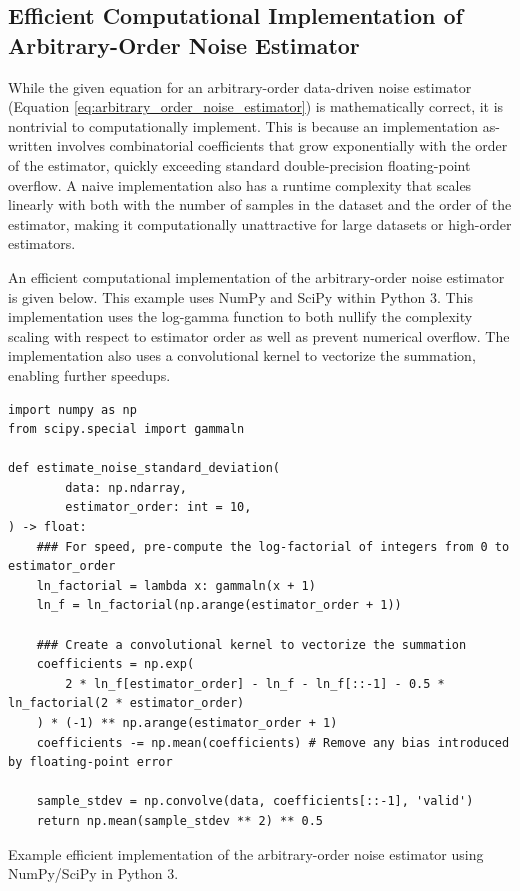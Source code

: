 \documentclass[conf]{new-aiaa}
\begin{document}
    \newpage

    \subsection{Efficient Computational Implementation of Arbitrary-Order Noise Estimator}

    While the given equation for an arbitrary-order data-driven noise estimator (Equation \ref{eq:arbitrary_order_noise_estimator}) is mathematically correct, it is nontrivial to computationally implement. This is because an implementation as-written involves combinatorial coefficients that grow exponentially with the order of the estimator, quickly exceeding standard double-precision floating-point overflow. A naive implementation also has a runtime complexity that scales linearly with both with the number of samples in the dataset and the order of the estimator, making it computationally unattractive for large datasets or high-order estimators.

    An efficient computational implementation of the arbitrary-order noise estimator is given below. This example uses NumPy and SciPy within Python 3. This implementation uses the log-gamma function to both nullify the complexity scaling with respect to estimator order as well as prevent numerical overflow. The implementation also uses a convolutional kernel to vectorize the summation, enabling further speedups.

    \begin{listing}[H]
        \begin{verbatim}
import numpy as np
from scipy.special import gammaln

def estimate_noise_standard_deviation(
        data: np.ndarray,
        estimator_order: int = 10,
) -> float:
    ### For speed, pre-compute the log-factorial of integers from 0 to estimator_order
    ln_factorial = lambda x: gammaln(x + 1)
    ln_f = ln_factorial(np.arange(estimator_order + 1))

    ### Create a convolutional kernel to vectorize the summation
    coefficients = np.exp(
        2 * ln_f[estimator_order] - ln_f - ln_f[::-1] - 0.5 * ln_factorial(2 * estimator_order)
    ) * (-1) ** np.arange(estimator_order + 1)
    coefficients -= np.mean(coefficients) # Remove any bias introduced by floating-point error

    sample_stdev = np.convolve(data, coefficients[::-1], 'valid')
    return np.mean(sample_stdev ** 2) ** 0.5

        \end{verbatim}
        \caption{Example efficient implementation of the arbitrary-order noise estimator using NumPy/SciPy in Python 3.}
        \label{listing:efficient_arbitrary_order_noise_estimator}
    \end{listing}
\end{document}
